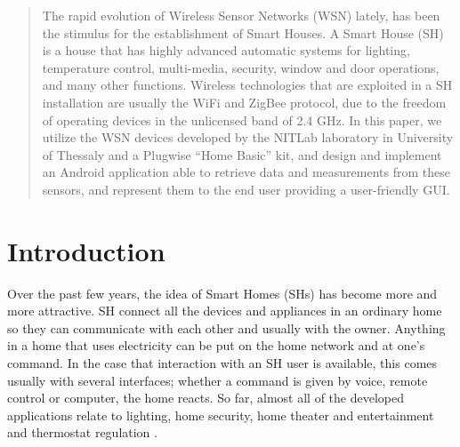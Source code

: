 \documentclass[conference]{IEEEtran}
\begin{document}




\maketitle


\begin{abstract}
The rapid evolution of Wireless Sensor Networks (WSN) lately, has been the stimulus for the establishment of Smart Houses. 
A Smart House (SH) is a house that has highly advanced automatic systems for lighting, temperature control, multi-media, security, window and door operations, and many other functions. 
Wireless technologies that are exploited in a SH installation are usually the WiFi and ZigBee protocol, due to the freedom of operating devices in the unlicensed band of 2.4 GHz. 
In this paper, we utilize the WSN devices developed by the NITLab laboratory in University of Thessaly and a Plugwise “Home Basic” kit, and design and implement an Android application able to retrieve data and measurements from these sensors, and represent them to the end user providing a user-friendly GUI.


\end{abstract}





%
\IEEEpeerreviewmaketitle



\section{Introduction}
Over the past few years, the idea of Smart Homes (SHs) has become more and more attractive.
SH connect all the devices and appliances in an ordinary home so they can communicate with each other and usually with the owner. 
Anything in a home that uses electricity can be put on the home network and at one’s command. 
In the case that interaction with an SH user is available, this comes usually with several interfaces; whether a command is given by voice, remote control or computer, the home reacts. 
So far, almost all of the developed applications relate to lighting, home security, home theater and entertainment and thermostat regulation \cite{howshswork}.
\end{document}
